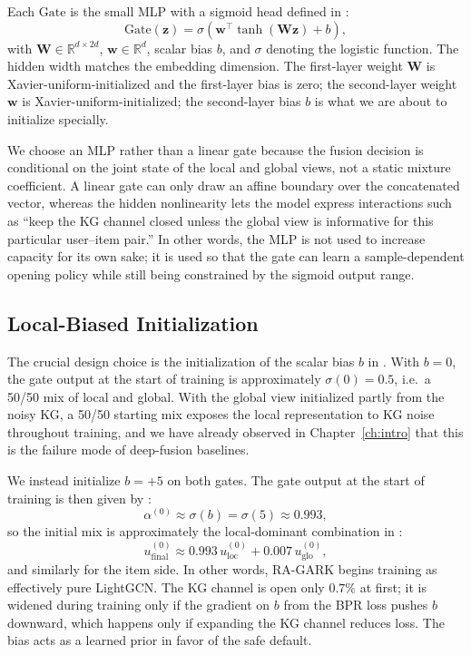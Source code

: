 Each $\mathrm{Gate}$ is the small MLP with a sigmoid head defined in :
\begin{equation}
\label{eq:gate-mlp}
\mathrm{Gate}(\mathbf{z}) = \sigma\!\left( \mathbf{w}^{\top} \tanh\!\left( \mathbf{W} \mathbf{z} \right) + b \right),
\end{equation}
with $\mathbf{W} \in \mathbb{R}^{d \times 2d}$, $\mathbf{w} \in \mathbb{R}^{d}$, scalar bias $b$, and $\sigma$ denoting the logistic function. The hidden width matches the embedding dimension. The first-layer weight $\mathbf{W}$ is Xavier-uniform-initialized and the first-layer bias is zero; the second-layer weight $\mathbf{w}$ is Xavier-uniform-initialized; the second-layer bias $b$ is what we are about to initialize specially.

We choose an MLP rather than a linear gate because the fusion decision is conditional on the joint state of the local and global views, not a static mixture coefficient. A linear gate can only draw an affine boundary over the concatenated vector, whereas the hidden nonlinearity lets the model express interactions such as ``keep the KG channel closed unless the global view is informative for this particular user--item pair.'' In other words, the MLP is not used to increase capacity for its own sake; it is used so that the gate can learn a sample-dependent opening policy while still being constrained by the sigmoid output range.

\subsection{Local-Biased Initialization}
\label{sec:gate-bias}

The crucial design choice is the initialization of the scalar bias $b$ in . With $b = 0$, the gate output at the start of training is approximately $\sigma(0) = 0.5$, i.e.\ a 50/50 mix of local and global. With the global view initialized partly from the noisy KG, a 50/50 starting mix exposes the local representation to KG noise throughout training, and we have already observed in Chapter~\ref{ch:intro} that this is the failure mode of deep-fusion baselines.

We instead initialize $b = +5$ on both gates. The gate output at the start of training is then given by :
\begin{equation}
\label{eq:alpha-init}
\alpha^{(0)} \approx \sigma(b) = \sigma(5) \approx 0.993,
\end{equation}
so the initial mix is approximately the local-dominant combination in :
\begin{equation}
\label{eq:mix-init}
u_{\mathrm{final}}^{(0)} \approx 0.993\, u_{\mathrm{loc}}^{(0)} + 0.007\, u_{\mathrm{glo}}^{(0)},
\end{equation}
and similarly for the item side. In other words, RA-GARK begins training as effectively pure LightGCN. The KG channel is open only $0.7\%$ at first; it is widened during training only if the gradient on $b$ from the BPR loss pushes $b$ downward, which happens only if expanding the KG channel reduces loss. The bias acts as a learned prior in favor of the safe default.

